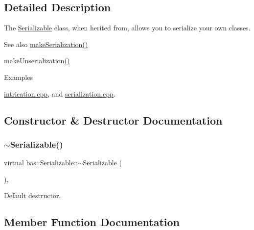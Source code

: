 \subsection{Detailed Description}
The \mbox{\hyperlink{classbas_1_1Serializable}{Serializable}} class, when herited from, allows you to serialize your own classes. 

\begin{DoxySeeAlso}{See also}
\mbox{\hyperlink{classbas_1_1Serializable_a013fd7c7acd4979418a7d30651a4b135}{make\+Serialization()}} 

\mbox{\hyperlink{classbas_1_1Serializable_af46002b3532fb719fa47e1d7cc731dd2}{make\+Unserialization()}} 
\end{DoxySeeAlso}
\begin{Desc}
\item[Examples]\par
\mbox{\hyperlink{intrication_8cpp-example}{intrication.\+cpp}}, and \mbox{\hyperlink{serialization_8cpp-example}{serialization.\+cpp}}.\end{Desc}


\subsection{Constructor \& Destructor Documentation}
\mbox{\label{classbas_1_1Serializable_ab604b55953376e9022d28988c698986e}} 
\subsubsection{\texorpdfstring{$\sim$Serializable()}{~Serializable()}}
{\footnotesize\ttfamily virtual bas\+::\+Serializable\+::$\sim$\+Serializable (\begin{DoxyParamCaption}{ }\end{DoxyParamCaption})\hspace{0.3cm}{\ttfamily [virtual]}, {\ttfamily [default]}}



Default destructor. 



\subsection{Member Function Documentation}
\mbox{\label{classbas_1_1Serializable_a013fd7c7acd4979418a7d30651a4b135}} 
